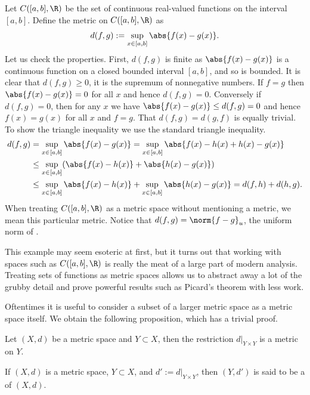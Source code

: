 \documentclass[12pt]{book}
\begin{document}
\begin{example} \label{example:msC01}
Let $C([a,b],\R)$ be the set of continuous real-valued functions on the
interval $[a,b]$.
Define the metric on $C([a,b],\R)$ as
\begin{equation*}
d(f,g) := \sup_{x \in [a,b]} \abs{f(x)-g(x)} .
\end{equation*}
Let us check the properties.
First, $d(f,g)$ is finite as
$\abs{f(x)-g(x)}$ is a continuous function on a closed bounded interval
$[a,b]$, and so is bounded.
It is clear that $d(f,g) \geq 0$, 
it is the supremum of nonnegative numbers.
If $f = g$
then $\abs{f(x)-g(x)} = 0$ for all $x$ and hence $d(f,g) = 0$.
Conversely
if $d(f,g) = 0$, then for any $x$ we have $\abs{f(x)-g(x)} \leq d(f,g) = 0$
and hence $f(x) = g(x)$ for all $x$ and $f=g$.
That $d(f,g) = d(g,f)$
is equally trivial.
To show the triangle inequality we use the standard
triangle inequality.
\begin{equation*}
\begin{split}
d(f,g) & =
\sup_{x \in [a,b]} \abs{f(x)-g(x)} =
\sup_{x \in [a,b]} \abs{f(x)-h(x)+h(x)-g(x)}
\\
& \leq
\sup_{x \in [a,b]} ( \abs{f(x)-h(x)}+\abs{h(x)-g(x)} )
\\
& \leq
\sup_{x \in [a,b]} \abs{f(x)-h(x)}+
\sup_{x \in [a,b]} \abs{h(x)-g(x)} = d(f,h) + d(h,g) .
\end{split}
\end{equation*}
When treating $C([a,b],\R)$ as a metric space without mentioning a metric, we mean this
particular metric.
Notice that $d(f,g) = \norm{f-g}_u$, the uniform norm of .

This example may seem esoteric at first, but it turns out that working with
spaces such as $C([a,b],\R)$ is really the meat of a large part of modern 
analysis.
Treating sets of functions as metric spaces allows us to
abstract away a lot of the grubby detail and prove powerful results such as
Picard's theorem with less work.
\end{example}

Oftentimes it is useful to consider a subset of a larger metric space
as a metric space itself.
We obtain the following proposition, which has
a trivial proof.

\begin{prop}
Let $(X,d)$ be a metric space and $Y \subset X$, then the restriction
$d|_{Y \times Y}$ is a metric on $Y$.
\end{prop}

\begin{defn}
If $(X,d)$ is a metric space, $Y \subset X$, and $d' := d|_{Y \times Y}$,
then $(Y,d')$ is said to be a \emph{} of $(X,d)$.
\end{defn}
\end{document}
